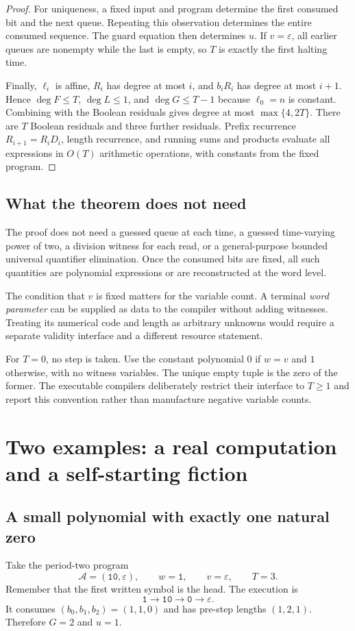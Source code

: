 \documentclass[11pt,a4paper]{article}
\theoremstyle{definition}
\theoremstyle{remark}
\newcommand{\eps}{\varepsilon}
\newcommand{\CT}{\mathcal A}
\newcommand{\word}[1]{\mathtt{#1}}
\newcommand{\srctag}[1]{\texorpdfstring{\hspace{0.5em}{\normalfont\small\color{accent}[#1]}}{ [#1]}}
\begin{document}
\begin{proof}
For uniqueness, a fixed input and program determine the first consumed bit and the next queue. Repeating this observation determines the entire consumed sequence. The guard equation then determines $u$. If $v=\eps$, all earlier queues are nonempty while the last is empty, so $T$ is exactly the first halting time.

Finally, $\ell_i$ is affine, $R_i$ has degree at most $i$, and $b_iR_i$ has degree at most $i+1$. Hence $\deg F\leq T$, $\deg L\leq1$, and $\deg G\leq T-1$ because $\ell_0=n$ is constant. Combining with the Boolean residuals gives degree at most $\max\{4,2T\}$. There are $T$ Boolean residuals and three further residuals. Prefix recurrence $R_{i+1}=R_iD_i$, length recurrence, and running sums and products evaluate all expressions in $O(T)$ arithmetic operations, with constants from the fixed program.
\end{proof}

\subsection{What the theorem does not need}
The proof does not need a guessed queue at each time, a guessed time-varying power of two, a division witness for each read, or a general-purpose bounded universal quantifier elimination. Once the consumed bits are fixed, all such quantities are polynomial expressions or are reconstructed at the word level.

The condition that $v$ is fixed matters for the variable count. A terminal \emph{word parameter} can be supplied as data to the compiler without adding witnesses. Treating its numerical code and length as arbitrary unknowns would require a separate validity interface and a different resource statement.

For $T=0$, no step is taken. Use the constant polynomial $0$ if $w=v$ and $1$ otherwise, with no witness variables. The unique empty tuple is the zero of the former. The executable compilers deliberately restrict their interface to $T\geq1$ and report this convention rather than manufacture negative variable counts.

\section{Two examples: a real computation and a self-starting fiction\srctag{07}}
\subsection{A small polynomial with exactly one natural zero}
Take the period-two program
\[
 \CT=(\word{10},\eps),\qquad w=\word{1},\qquad v=\eps,\qquad T=3.
\]
Remember that the first written symbol is the head. The execution is
\[
 \word{1}\longrightarrow\word{10}\longrightarrow\word{0}
 \longrightarrow\eps.
\]
It consumes $(b_0,b_1,b_2)=(1,1,0)$ and has pre-step lengths $(1,2,1)$. Therefore $G=2$ and $u=1$.
\end{document}

